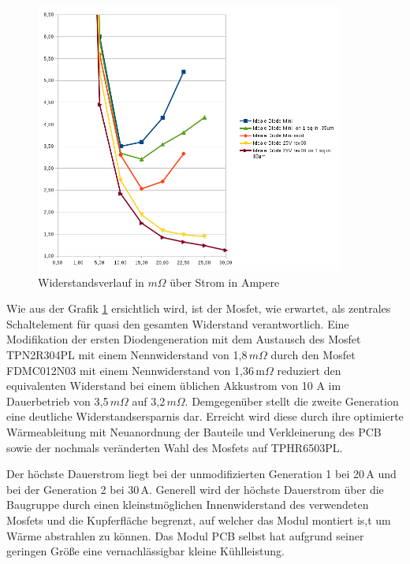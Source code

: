 \begin{figure}[H]
\centering
\includegraphics[width=0.9\textwidth]{graphen/Wiederstand-Strom-Ideale_Diode_ver00} 
\caption{Widerstandsverlauf in $m\Omega$ über Strom in Ampere} 
\label{fig:Widerstandsverlauf}
\end{figure}


Wie aus der Grafik \ref{fig:Widerstandsverlauf} ersichtlich wird, ist der Mosfet, wie erwartet, als zentrales Schaltelement für quasi den gesamten Widerstand verantwortlich.
Eine Modifikation der ersten Diodengeneration mit dem Austausch des Mosfet TPN2R304PL mit einem Nennwiderstand von 1,8\,$m\Omega$ \cite{TPN2R304PL} durch den Mosfet FDMC012N03 mit einem Nennwiderstand von 1,36\,m$\Omega$ \cite{FDMC012N03} reduziert den equivalenten Widerstand bei einem üblichen Akkustrom von 10 A im Dauerbetrieb von 3,5\,$m\Omega$  auf 3,2\,$m\Omega$.
Demgegenüber stellt die zweite Generation eine deutliche Widerstandsersparnis dar.
Erreicht wird diese durch ihre optimierte Wärmeableitung mit Neuanordnung der Bauteile und Verkleinerung des PCB sowie der nochmals veränderten Wahl des Mosfets auf TPHR6503PL.

Der höchste Dauerstrom liegt bei der unmodifizierten Generation 1 bei 20\,A und bei der Generation 2 bei 30\,A. 
Generell wird der höchste Dauerstrom über die Baugruppe durch einen kleinstmöglichen Innenwiderstand des verwendeten Mosfets und die Kupferfläche begrenzt, auf welcher das Modul montiert is,t um Wärme abstrahlen zu können. Das Modul PCB selbst hat aufgrund seiner geringen Größe eine vernachlässigbar kleine Kühlleistung.

